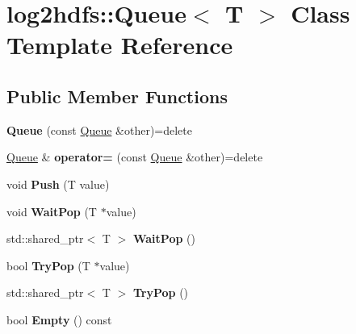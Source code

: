 \hypertarget{classlog2hdfs_1_1Queue}{}\section{log2hdfs\+:\+:Queue$<$ T $>$ Class Template Reference}
\label{classlog2hdfs_1_1Queue}
\subsection*{Public Member Functions}
\begin{DoxyCompactItemize}
\item 
{\bfseries Queue} (const \hyperlink{classlog2hdfs_1_1Queue}{Queue} \&other)=delete\hypertarget{classlog2hdfs_1_1Queue_a01707744bc87e47674096f1bbf1a641b}{}\label{classlog2hdfs_1_1Queue_a01707744bc87e47674096f1bbf1a641b}

\item 
\hyperlink{classlog2hdfs_1_1Queue}{Queue} \& {\bfseries operator=} (const \hyperlink{classlog2hdfs_1_1Queue}{Queue} \&other)=delete\hypertarget{classlog2hdfs_1_1Queue_a707a5bc452a90ab97974b73f071cf125}{}\label{classlog2hdfs_1_1Queue_a707a5bc452a90ab97974b73f071cf125}

\item 
void {\bfseries Push} (T value)\hypertarget{classlog2hdfs_1_1Queue_a97780e4f01cc15105d714a0eda61c18e}{}\label{classlog2hdfs_1_1Queue_a97780e4f01cc15105d714a0eda61c18e}

\item 
void {\bfseries Wait\+Pop} (T $\ast$value)\hypertarget{classlog2hdfs_1_1Queue_a8d4f35cbd85041d9c00629b66b595685}{}\label{classlog2hdfs_1_1Queue_a8d4f35cbd85041d9c00629b66b595685}

\item 
std\+::shared\+\_\+ptr$<$ T $>$ {\bfseries Wait\+Pop} ()\hypertarget{classlog2hdfs_1_1Queue_a5cc8bf26f95ab4deaa1d90ca50d05942}{}\label{classlog2hdfs_1_1Queue_a5cc8bf26f95ab4deaa1d90ca50d05942}

\item 
bool {\bfseries Try\+Pop} (T $\ast$value)\hypertarget{classlog2hdfs_1_1Queue_a7b4afb38ec816a658323cac7497df9c9}{}\label{classlog2hdfs_1_1Queue_a7b4afb38ec816a658323cac7497df9c9}

\item 
std\+::shared\+\_\+ptr$<$ T $>$ {\bfseries Try\+Pop} ()\hypertarget{classlog2hdfs_1_1Queue_a739fedca5b1cc346f1d2cde1ee79aeea}{}\label{classlog2hdfs_1_1Queue_a739fedca5b1cc346f1d2cde1ee79aeea}

\item 
bool {\bfseries Empty} () const \hypertarget{classlog2hdfs_1_1Queue_a8f641b1e609ec46aaf5be41c554209e6}{}\label{classlog2hdfs_1_1Queue_a8f641b1e609ec46aaf5be41c554209e6}

\end{DoxyCompactItemize}
